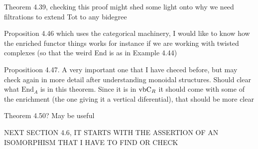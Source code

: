 \documentclass[twoside]{article}
\begin{document}
Theorem 4.39, checking this proof might shed some light onto why we need filtrations to extend Tot to any bidegree

Proposition 4.46 which uses the categorical machinery, I would like to know how the enriched functor things works for instance if we are working with twisted complexes (so that the weird End is as in Example 4.44)

Propositioon 4.47. A very important one that I have checed before, but may check again in more detail after understanding monoidal structures. Should clear what $\mathrm{End}_A$ is in this theorem. Since it is in $\mathrm{vbC}_R$ it should come with some of the enrichment (the one giving it a vertical diferential), that should be more clear

Theorem 4.50? May be useful

NEXT SECTION 4.6, IT STARTS WITH THE ASSERTION OF AN ISOMORPHISM THAT I HAVE TO FIND OR CHECK
\end{document}
